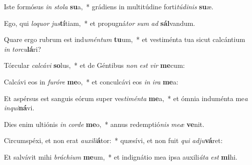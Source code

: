 \item Iste formósus \textit{in} \textit{sto}\textit{la} \textbf{su}a,~* grádiens in multitúdine forti\textit{tú}\textit{di}\textit{nis} \textbf{su}æ.
\item Ego, qui \textit{lo}\textit{quor} \textit{jus}\textbf{tí}tiam,~* et propugná\textit{tor} \textit{sum} \textit{ad} \textbf{sál}vandum.
\item Quare ergo rubrum est ind\textit{u}\textit{mén}\textit{tum} \textbf{tu}um,~* et vestiménta tua sicut calcántium \textit{in} \textit{tor}\textit{cu}\textbf{lá}ri?
\item Tórcular \textit{cal}\textit{cá}\textit{vi} \textbf{so}lus,~* et de Géntibus \textit{non} \textit{est} \textit{vir} \textbf{me}cum:
\item Calcávi eos in \textit{fu}\textit{ró}\textit{re} \textbf{me}o,~* et conculcávi eos \textit{in} \textit{i}\textit{ra} \textbf{me}a:
\item Et aspérsus est sanguis eórum super ves\textit{ti}\textit{mén}\textit{ta} \textbf{me}a,~* et ómnia induménta me\textit{a} \textit{in}\textit{qui}\textbf{ná}vi.
\item Dies enim ultiónis \textit{in} \textit{cor}\textit{de} \textbf{me}o,~* annus redemptió\textit{nis} \textit{me}\textit{æ} \textbf{ve}nit.
\item Circumspéxi, et non erat \textit{au}\textit{xi}\textit{li}\textbf{á}tor:~* quæsívi, et non fuit \textit{qui} \textit{ad}\textit{ju}\textbf{vá}ret:
\item Et salvávit mihi \textit{brá}\textit{chi}\textit{um} \textbf{me}um,~* et indignátio mea ipsa auxili\textit{á}\textit{ta} \textit{est} \textbf{mi}hi.
